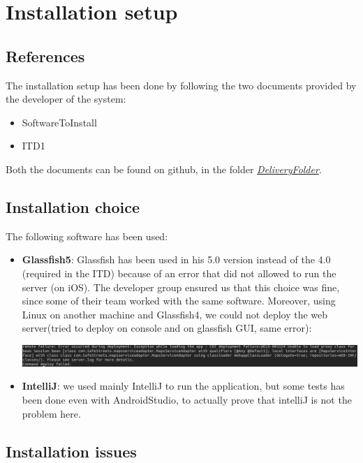 \documentclass[../ATD.tex]{subfiles}
\begin{document}
    \chapter{Installation setup}\label{ch:installation-setup}
    \section{References}\label{sec:references}
    The installation setup has been done by following the two documents provided by the developer of the system:
    \begin{itemize}
        \item SoftwareToInstall
        \item ITD1
    \end{itemize}
    Both the documents can be found on github, in the folder \href{https://github.com/gianfi12/AbboAccordiBonetti/tree/master/DeliveryFolder}{\emph{DeliveryFolder}}.

    \section{Installation choice}\label{sec:installation-choice}
    The following software has been used:
    \begin{itemize}
        \item \textbf{Glassfish5}: Glassfish has been used in his 5.0 version instead of the 4.0 (required in the ITD) because of an error that did not allowed to run the server (on iOS).
        The developer group ensured us that this choice was fine, since some of their team worked with the same software.
        Moreover, using Linux on another machine and Glassfish4, we could not deploy the web server(tried to deploy on console and on glassfish GUI, same error):

        \includegraphics[scale = 0.35]{assets/deployError.png}

        \item \textbf{IntelliJ}: we used mainly IntelliJ to run the application, but some tests has been done even with AndroidStudio, to actually prove that
        intelliJ is not the problem here.
    \end{itemize}
    \newpage
    \section{Installation issues}\label{sec:installation-issues}
\end{document}
